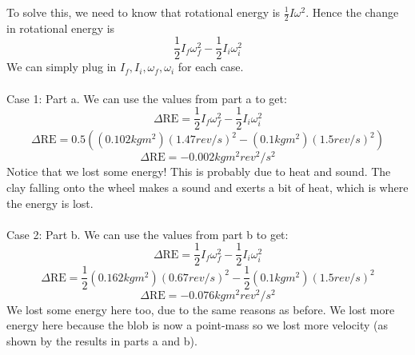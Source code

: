 \documentclass[11pt]{scrartcl}
\begin{document}
\begin{soln}
  To solve this, we need to know that rotational energy is $\frac{1}{2}I\omega^2$.
  Hence the change in rotational energy is
  $$\frac{1}{2}I_f\omega_f^2-\frac{1}{2}I_i\omega_i^2$$
  We can simply plug in $I_f, I_i, \omega_f, \omega_i$ for each case.
  \\ \\
  Case 1: Part a. We can use the values from part a to get:
  $$\Delta \mathrm{RE}=\frac{1}{2}I_f\omega_f^2-\frac{1}{2}I_i\omega_i^2$$
  $$\Delta \mathrm{RE}=0.5((0.102 kg m^2)(1.47 rev/s)^2-(0.1 kg m^2)(1.5 rev/s)^2)$$
  $$\Delta \mathrm{RE}=-0.002 kg m^2 rev^2/s^2$$
  Notice that we lost some energy! This is probably due to heat and sound.
  The clay falling onto the wheel makes a sound and exerts a bit of heat, which
  is where the energy is lost.
  \\ \\
  Case 2: Part b. We can use the values from part b to get:
  $$\Delta \mathrm{RE}=\frac{1}{2}I_f \omega_f^2-\frac{1}{2}I_i\omega_i^2$$
  $$\Delta \mathrm{RE}=\frac{1}{2}(0.162 kgm^2)(0.67 rev/s)^2-\frac{1}{2}(0.1 kgm^2)(1.5 rev/s)^2$$
  $$\Delta \mathrm{RE}=-0.076 kg m^2 rev^2/s^2$$
  We lost some energy here too, due to the same reasons as before. We lost
  more energy here because the blob is now a point-mass so we lost more velocity
  (as shown by the results in parts a and b).
\end{soln}
\end{document}
